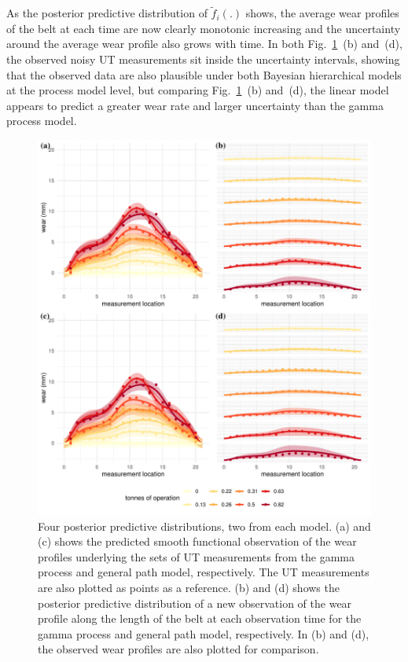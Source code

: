 As the posterior predictive distribution of $\tilde{f}_i(.)$ shows, the average wear profiles of the belt at each time are now clearly monotonic increasing and the uncertainty around the average wear profile also grows with time. In both Fig.~\ref{fig:post-pred-dists-beltwear}~(b) and~(d), the observed noisy UT measurements sit inside the uncertainty intervals, showing that the observed data are also plausible under both Bayesian hierarchical models at the process model level, but comparing Fig.~\ref{fig:post-pred-dists-beltwear}~(b) and~(d), the linear model appears to predict a greater wear rate and larger uncertainty than the gamma process model.

\begin{figure}
  \centering
  \includegraphics[width=\textwidth]{figures/ch-6/post_pred_belt_wear.pdf}
  \caption{Four posterior predictive distributions, two from each model. (a) and (c) shows the predicted smooth functional observation of the wear profiles underlying the sets of UT measurements from the gamma process and general path model, respectively. The UT measurements are also plotted as points as a reference. (b) and (d) shows the posterior predictive distribution of a new observation of the wear profile along the length of the belt at each observation time for the gamma process and general path model, respectively. In (b) and (d), the observed wear profiles are also plotted for comparison.}
  \label{fig:post-pred-dists-beltwear}
\end{figure}

